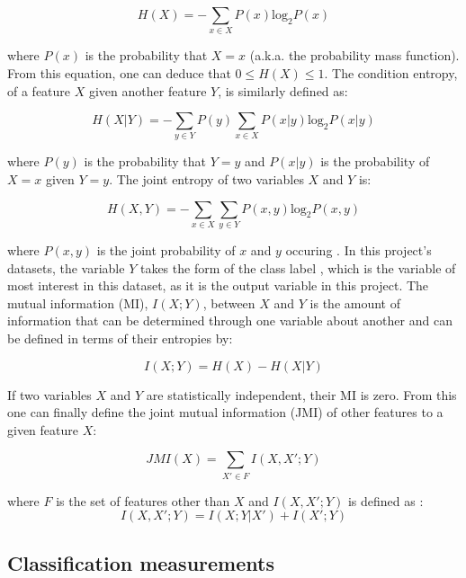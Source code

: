 \documentclass[12pt]{article}
\begin{document}
\begin{equation}
H(X)=-\sum_{x \in X}{P(x)\textrm{log}_{2}P(x)}
\end{equation}

where $P(x)$ is the probability that $X = x$ (a.k.a. the probability mass function). From this equation, one can deduce that $0 \leqslant H(X) \leqslant 1$. The condition entropy, of a feature $X$ given another feature $Y$, is similarly defined as:

\begin{equation}
H(X|Y)=-\sum_{y \in Y}{P(y)\sum_{x \in X}{P(x|y)\textrm{log}_{2}P(x|y)}}
\end{equation}

where $P(y)$ is the probability that $Y = y$ and $P(x|y)$ is the probability of $X = x$ given $Y = y$. The joint entropy of two variables $X$ and $Y$ is:

\begin{equation}
H(X,Y)=-\sum_{x \in X}\sum_{y \in Y}{P(x,y)\textrm{log}_{2}P(x,y)}
\end{equation}

where $P(x,y)$ is the joint probability of $x$ and $y$ occuring \cite{bennasar2015feature}. In this project's datasets, the variable $Y$ takes the form of the class label \cite{lyon2016fifty}, which is the variable of most interest in this dataset, as it is the output variable in this project. The mutual information (MI), $I(X;Y)$, between $X$ and $Y$ is the amount of information that can be determined through one variable about another and can be defined in terms of their entropies by:

\begin{equation}
I(X;Y)= H(X) - H(X|Y)
\end{equation}

If two variables $X$ and $Y$ are statistically independent, their MI is zero. From this one can finally define the joint mutual information (JMI) of other features to a given feature $X$:

\begin{equation}
JMI(X)= \sum_{X' \in F} I(X,X';Y)
\end{equation}

where $F$ is the set of features other than $X$ \cite{lyon2016fifty} and $I(X,X';Y)$ is defined as \cite{bennasar2015feature}:
\begin{equation}
I(X,X';Y) = I(X;Y|X')+I(X';Y)
\end{equation}

\subsection{Classification measurements}
\end{document}
